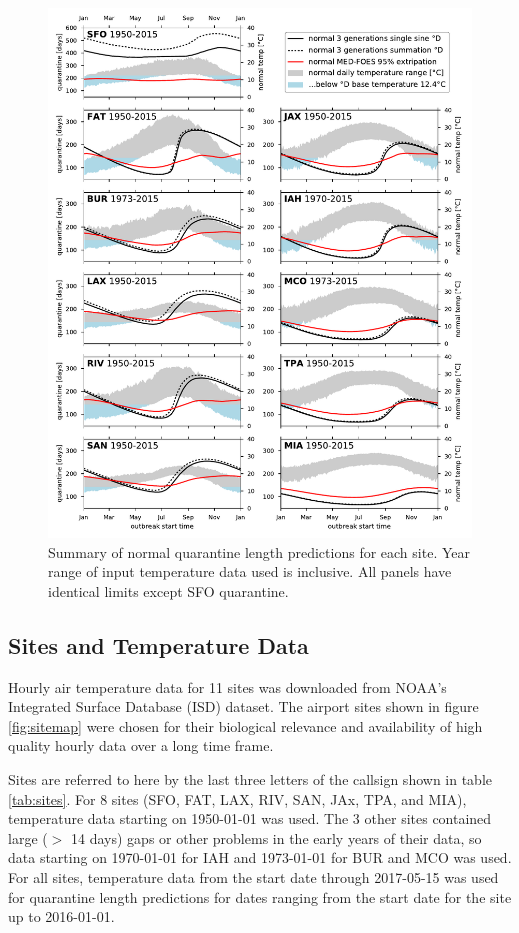 \documentclass[10pt,a4paper,twocolumn]{article}
\begin{document}
\begin{figure}[ht!] %
\centering
\includegraphics[width=1\textwidth]{figs/fig_main.pdf}
\caption{\label{fig:main_summary}Summary of normal quarantine length predictions for each site.
Year range of input temperature data used is inclusive.
All panels have identical limits except SFO quarantine.}
\end{figure}



\subsection*{Sites and Temperature Data}
Hourly air temperature data for 11 sites was downloaded from 
NOAA's Integrated Surface Database (ISD) dataset\cite{smith_integrated_2011,NOAA_ISD_portal}.
The airport sites shown in figure \ref{fig:sitemap} 
were chosen for their biological relevance and 
availability of high quality hourly data over a long time frame.

Sites are referred to here by the last three letters of the callsign shown in table \ref{tab:sites}.
For 8 sites (SFO, FAT, LAX, RIV, SAN, JAx, TPA, and MIA), temperature data starting on 1950-01-01 was used.
The 3 other sites contained large ($>$ 14 days) gaps or other problems in the early years of their data,
so data starting on 1970-01-01 for IAH and 1973-01-01 for BUR and MCO was used.
For all sites, temperature data from the start date through 2017-05-15 was used
for quarantine length predictions for dates ranging from the start date for the site up to 2016-01-01.
\end{document}
